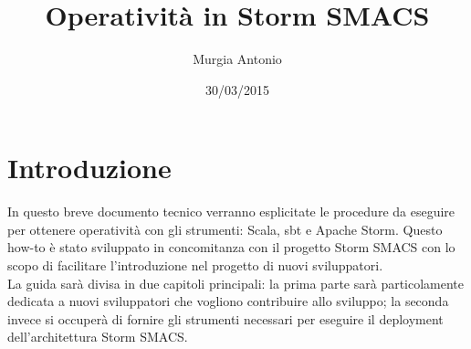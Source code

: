 \documentclass[12pt]{article}
\title{Operativit\`a in Storm SMACS}
\author{Murgia Antonio}
\date{30/03/2015}%
\begin{document}
\maketitle

\section{Introduzione}
In questo breve documento tecnico verranno esplicitate le procedure da eseguire per ottenere operativit\`a con gli strumenti: Scala, sbt e Apache Storm.
Questo how-to \`e stato sviluppato in concomitanza con il progetto Storm SMACS con lo scopo di facilitare l'introduzione nel progetto di nuovi sviluppatori.\\
La guida sar\`a divisa in due capitoli principali: la prima parte sar\`a particolamente dedicata a nuovi sviluppatori che vogliono contribuire allo sviluppo; la seconda invece si occuper\`a di fornire gli strumenti necessari per eseguire il deployment dell'architettura Storm SMACS.
\end{document}
